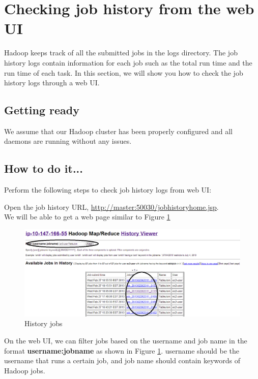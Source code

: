 \section{Checking job history from the web UI}
Hadoop keeps track of all the submitted jobs in the logs directory. The job history logs contain information for each job such as the total run time and the run time of each task. In this section, we will show you how to check the job history logs through a web UI.
\subsection*{Getting ready}
We assume that our Hadoop cluster has been properly configured and all daemons are running without any issues.
\subsection*{How to do it...}
Perform the following steps to check job history logs from web UI:

Open the job history URL, \url{http://master:50030/jobhistoryhome.jsp}. \\
We will be able to get a web page similar to Figure \ref{fig:history.jobs}
\begin{figure}[ht]
  \centering
  \includegraphics[width=\textwidth]{figs/5163os_04_01.png}
  \caption{History jobs}\label{fig:history.jobs}
\end{figure} 

On the web UI, we can filter jobs based on the username and job name in the format \textbf{username:jobname} as shown in Figure \ref{fig:history.jobs}. username should be the username that runs a certain job, and job name should contain keywords of Hadoop jobs.

